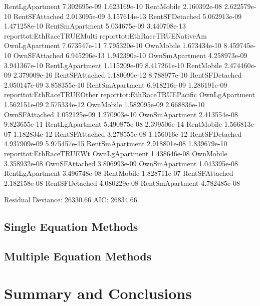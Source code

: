 \documentclass{article}
\begin{document}
\begin{Schunk}
\begin{Soutput}
RentLgApartment              7.302695e-09               1.623169e-10
RentMobile                   2.160392e-08               2.622579e-10
RentSFAttached               2.013095e-09               3.157614e-13
RentSFDetached               5.062913e-09               1.471258e-10
RentSmApartment              5.034675e-09               3.440708e-13
                reporttot:EthRaceTRUEMulti reporttot:EthRaceTRUENativeAm
OwnLgApartment                7.673547e-11                  7.795320e-10
OwnMobile                     1.673434e-10                  8.459745e-10
OwnSFAttached                 6.945296e-13                  1.942390e-10
OwnSmApartment                4.258973e-09                  3.941367e-10
RentLgApartment               1.115209e-09                  8.417261e-10
RentMobile                    2.474460e-09                  2.379009e-10
RentSFAttached                1.180096e-12                  8.788977e-10
RentSFDetached                2.050147e-09                  3.858355e-10
RentSmApartment               6.918216e-09                  1.286191e-09
                reporttot:EthRaceTRUEOther reporttot:EthRaceTRUEPacific
OwnLgApartment                1.562151e-09                 2.575334e-12
OwnMobile                     1.582095e-09                 2.668836e-10
OwnSFAttached                 1.052125e-09                 1.270903e-10
OwnSmApartment                2.413554e-08                 9.823655e-11
RentLgApartment               5.490875e-08                 2.399506e-14
RentMobile                    1.566813e-07                 1.182834e-12
RentSFAttached                3.278555e-08                 1.156016e-12
RentSFDetached                4.937909e-09                 5.975457e-15
RentSmApartment               2.918801e-08                 1.839679e-10
                reporttot:EthRaceTRUEWt
OwnLgApartment             1.438646e-08
OwnMobile                  3.358932e-08
OwnSFAttached              3.806993e-09
OwnSmApartment             1.043395e-08
RentLgApartment            3.496748e-08
RentMobile                 1.828711e-07
RentSFAttached             2.182158e-08
RentSFDetached             4.080229e-08
RentSmApartment            4.782485e-08

Residual Deviance: 26330.66 
AIC: 26834.66 
\end{Soutput}
\end{Schunk}

  
  \subsection{Single Equation Methods}
  \subsection{Multiple Equation Methods}
  
\section{Summary and Conclusions}

\nocite{*}


\end{document}
